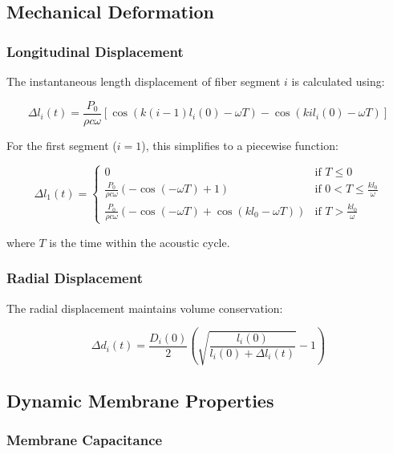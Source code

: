 \documentclass[11pt,a4paper]{article}
\begin{document}
\subsection{Mechanical Deformation}

\subsubsection{Longitudinal Displacement}

The instantaneous length displacement of fiber segment $i$ is calculated using:

\begin{equation}
\Delta l_i(t) = \frac{P_0}{\rho c \omega} \left[ \cos(k(i-1)l_i(0) - \omega T) - \cos(kil_i(0) - \omega T) \right]
\end{equation}

For the first segment ($i=1$), this simplifies to a piecewise function:

\begin{equation}
\Delta l_1(t) = \begin{cases}
0 & \text{if } T \leq 0 \\
\frac{P_0}{\rho c \omega}(-\cos(-\omega T) + 1) & \text{if } 0 < T \leq \frac{kl_0}{\omega} \\
\frac{P_0}{\rho c \omega}(-\cos(-\omega T) + \cos(kl_0 - \omega T)) & \text{if } T > \frac{kl_0}{\omega}
\end{cases}
\end{equation}

where $T$ is the time within the acoustic cycle.

\subsubsection{Radial Displacement}

The radial displacement maintains volume conservation:

\begin{equation}
\Delta d_i(t) = \frac{D_i(0)}{2} \left( \sqrt{\frac{l_i(0)}{l_i(0) + \Delta l_i(t)}} - 1 \right)
\end{equation}

\subsection{Dynamic Membrane Properties}

\subsubsection{Membrane Capacitance}
\end{document}
